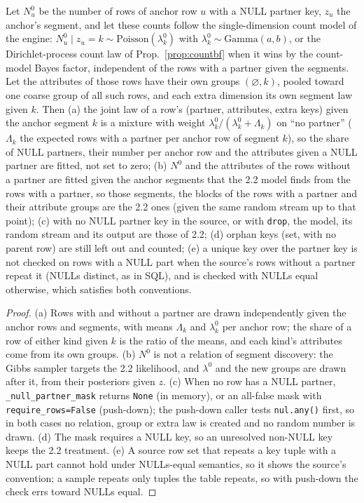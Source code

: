 \setcounter{proposition}{1842}
\begin{proposition}\label{prop:nullpartner}
Let $N^0_u$ be the number of rows of anchor row $u$ with a NULL partner key, $z_u$ the anchor's segment, and let these counts follow the single-dimension count model of the engine: $N^0_u\mid z_u=k\sim\mathrm{Poisson}(\lambda^0_k)$ with $\lambda^0_k\sim\mathrm{Gamma}(a,b)$, or the Dirichlet-process count law of Prop.~\ref{prop:countbf} when it wins by the count-model Bayes factor, independent of the rows with a partner given the segments. Let the attributes of those rows have their own groups $(\varnothing,k)$, pooled toward one coarse group of all such rows, and each extra dimension its own segment law given $k$. Then (a) the joint law of a row's (partner, attributes, extra keys) given the anchor segment $k$ is a mixture with weight $\lambda^0_k/(\lambda^0_k+\Lambda_k)$ on ``no partner'' ($\Lambda_k$ the expected rows with a partner per anchor row of segment $k$), so the share of NULL partners, their number per anchor row and the attributes given a NULL partner are fitted, not set to zero; (b) $N^0$ and the attributes of the rows without a partner are fitted given the anchor segments that the 2.2 model finds from the rows with a partner, so those segments, the blocks of the rows with a partner and their attribute groups are the 2.2 ones (given the same random stream up to that point); (c) with no NULL partner key in the source, or with \texttt{drop}, the model, its random stream and its output are those of 2.2; (d) orphan keys (set, with no parent row) are still left out and counted; (e) a unique key over the partner key is not checked on rows with a NULL part when the source's rows without a partner repeat it (NULLs distinct, as in SQL), and is checked with NULLs equal otherwise, which satisfies both conventions.
\end{proposition}
\begin{proof}
(a) Rows with and without a partner are drawn independently given the anchor rows and segments, with means $\Lambda_k$ and $\lambda^0_k$ per anchor row; the share of a row of either kind given $k$ is the ratio of the means, and each kind's attributes come from its own groups. (b) $N^0$ is not a relation of segment discovery: the Gibbs sampler targets the 2.2 likelihood, and $\lambda^0$ and the new groups are drawn after it, from their posteriors given $z$. (c) When no row has a NULL partner, \texttt{\_null\_partner\_mask} returns \texttt{None} (in memory), or an all-false mask with \texttt{require\_rows=False} (push-down); the push-down caller tests \texttt{nul.any()} first, so in both cases no relation, group or extra law is created and no random number is drawn. (d) The mask requires a NULL key, so an unresolved non-NULL key keeps the 2.2 treatment. (e) A source row set that repeats a key tuple with a NULL part cannot hold under NULLs-equal semantics, so it shows the source's convention; a sample repeats only tuples the table repeats, so with push-down the check errs toward NULLs equal.
\end{proof}

